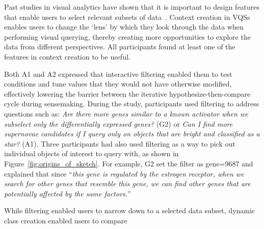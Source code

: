 \par Past studies in visual analytics 
have shown that it is important to design features 
that enable users to select relevant subsets of data~\cite{Amar2005,Heer2012}. 
Context creation in VQSs enables users to change the `lens' 
by which they look through the data 
when performing visual querying, 
thereby creating more opportunities 
to explore the data from different perspectives. 
All participants found at least 
one of the features in context creation to be useful.
\par Both A1 and A2 expressed that 
interactive filtering enabled 
them to test conditions and tune values 
that they would not have otherwise modified, 
effectively lowering the barrier between 
the iterative hypothesize-then-compare cycle during sensemaking.
During the study, participants used filtering 
to address questions such as: 
\textit{Are there more genes similar 
to a known activator when we subselect 
only the differentially expressed genes?} (G2) or \textit{Can I find more supernovae candidates if I query only on objects that are bright and classified as a star?} (A1). Three participants had also used filtering as a way to pick out individual objects of interest to query with, as shown in Figure~\ref{fig:origins_of_sketch}. For example, G2 set the filter as gene=9687 and explained that since ``\textit{this gene is regulated by the estrogen receptor, when we search for other genes that resemble this gene, we can find other genes that are potentially affected by the same factors.}''
\par While filtering enabled users to 
narrow down to a selected data subset, 
dynamic class creation enabled users to compare 
